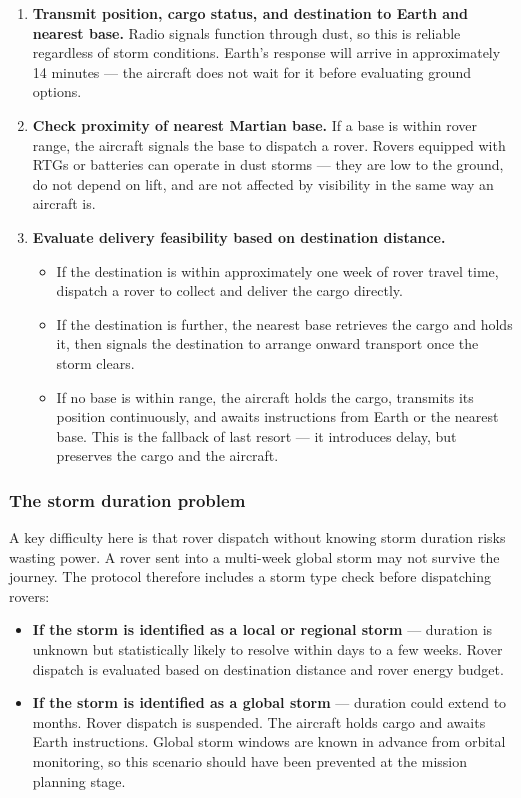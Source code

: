 \documentclass[a4paper,12pt]{article}
\begin{document}
\begin{enumerate}[itemsep=0.3em]
    \item \textbf{Transmit position, cargo status, and destination to Earth and nearest base.}
    Radio signals function through dust, so this is reliable regardless of storm conditions.
    Earth's response will arrive in approximately 14 minutes — the aircraft does not wait
    for it before evaluating ground options.

    \item \textbf{Check proximity of nearest Martian base.}
    If a base is within rover range, the aircraft signals the base to dispatch a rover.
    Rovers equipped with RTGs or batteries can operate in dust storms — they are low to the
    ground, do not depend on lift, and are not affected by visibility in the same way an
    aircraft is.

    \item \textbf{Evaluate delivery feasibility based on destination distance.}
    \begin{itemize}[itemsep=0.3em]
        \item If the destination is within approximately one week of rover travel time,
        dispatch a rover to collect and deliver the cargo directly.
        \item If the destination is further, the nearest base retrieves the cargo and holds
        it, then signals the destination to arrange onward transport once the storm clears.
        \item If no base is within range, the aircraft holds the cargo, transmits its
        position continuously, and awaits instructions from Earth or the nearest base.
        This is the fallback of last resort — it introduces delay, but preserves the cargo
        and the aircraft.
    \end{itemize}
\end{enumerate}

\subsubsection*{The storm duration problem}
A key difficulty here is that rover dispatch without knowing storm duration risks wasting
power. A rover sent into a multi-week global storm may not survive the journey. The protocol
therefore includes a storm type check before dispatching rovers:

\begin{itemize}[itemsep=0.3em]
    \item \textbf{If the storm is identified as a local or regional storm} — duration is
    unknown but statistically likely to resolve within days to a few weeks. Rover dispatch
    is evaluated based on destination distance and rover energy budget.
    \item \textbf{If the storm is identified as a global storm} — duration could extend
    to months. Rover dispatch is suspended. The aircraft holds cargo and awaits Earth
    instructions. Global storm windows are known in advance from orbital monitoring, so
    this scenario should have been prevented at the mission planning stage.
\end{itemize}
\end{document}

